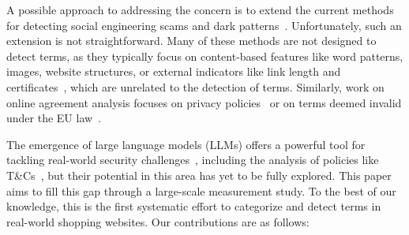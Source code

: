 A possible approach to addressing the concern is to extend the current methods for detecting social engineering scams and dark patterns~\citep{mathur2019dark, mathur2021makes, di2020ui, bongard2021definitely, li2023double, bitaab2023beyond, yang2023trident}. Unfortunately, such an extension is not straightforward. Many of these methods are not designed to detect \termname terms, as they typically focus on content-based features like word patterns, images, website structures, or external indicators like link length and certificates~\citep{bitaab2020scam, bilge2011exposure, kharraz2018surveylance, zhang2011textual, sakurai2020discovering, drury2019certified}, which are unrelated to the detection of \termname terms. Similarly, work on online agreement analysis focuses on privacy policies~\citep{xiang2023policychecker, harkous2018polisis, zhou2023policycomp, bui2023detection} or on terms deemed invalid under the EU law~\citep{lagioia2017automated, braun2021nlp, lippi2019claudette, limsopatham2021effectively, galassi2024unfair, galassi2020cross}.


The emergence of large language models (LLMs) offers a powerful tool for tackling real-world security challenges~\citep{van2022logomotive, li2018fake, zhang2014you, zheng2017smoke, sahingoz2019machine, bitaab2023beyond}, 
 including the analysis of policies like T\&Cs~\citep{rodriguez2024large, frasheri2024llm}, 
but their potential in this area has yet to be fully explored. This paper aims to fill this gap through a large-scale measurement study. To the best of our knowledge, this is the first systematic effort to categorize and detect \termname terms in real-world shopping websites. Our contributions are as follows:



